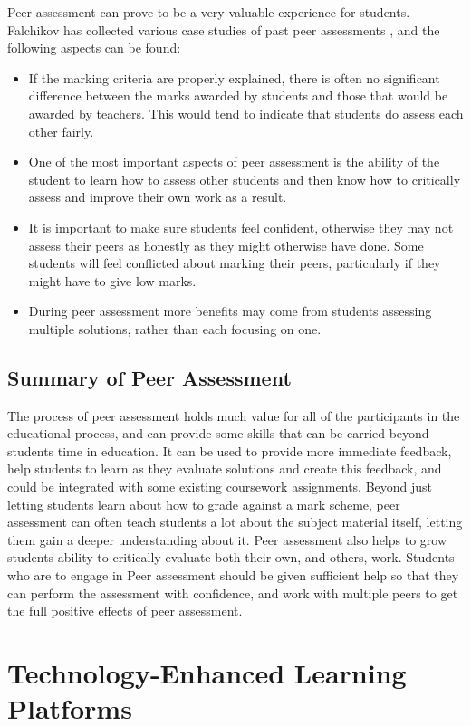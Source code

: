 \documentclass[a4paper,11pt]{report}
\begin{document}
Peer assessment can prove to be a very valuable experience for students. Falchikov has collected various case studies of past peer assessments \cite{falchikov_improving_2013}, and the following aspects can be found:
\begin{itemize}
 \item If the marking criteria are properly explained, there is often no significant difference between the marks awarded by students and those that would be awarded by teachers. This would tend to indicate that students do assess each other fairly.
 \item One of the most important aspects of peer assessment is the ability of the student to learn how to assess other students and then know how to critically assess and improve their own work as a result.
 \item It is important to make sure students feel confident, otherwise they may not assess their peers as honestly as they might otherwise have done. Some students will feel conflicted about marking their peers, particularly if they might have to give low marks.
 \item During peer assessment more benefits may come from students assessing multiple solutions, rather than each focusing on one.
\end{itemize}

\subsection{Summary of Peer Assessment}
The process of peer assessment holds much value for all of the participants in the educational process, and can provide some skills that can be carried beyond students time in education. It can be used to provide more immediate feedback, help students to learn as they evaluate solutions and create this feedback, and could be integrated with some existing coursework assignments. Beyond just letting students learn about how to grade against a mark scheme, peer assessment can often teach students a lot about the subject material itself, letting them gain a deeper understanding about it. Peer assessment also helps to grow students ability to critically evaluate both their own, and others, work. Students who are to engage in Peer assessment should be given sufficient help so that they can perform the assessment with confidence, and work with multiple peers to get the full positive effects of peer assessment.


\section{Technology-Enhanced Learning Platforms}
\end{document}
